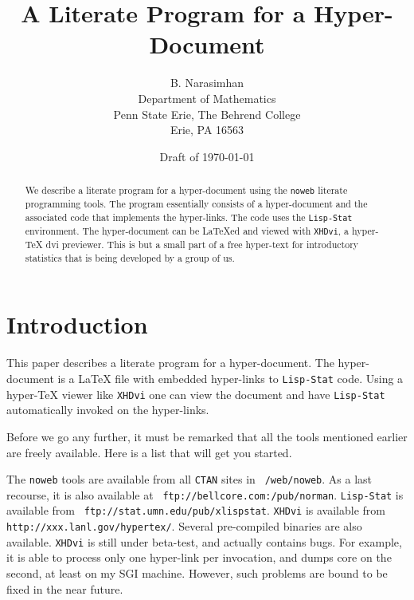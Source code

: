 
\pagestyle{noweb}
\noweboptions{}


\def\nw/{{\tt noweb}}
\def\xhdvi/{{\tt XHDvi}}
\def\xls/{{\tt Lisp-Stat}}
\def\web/{{\tt WEB}}
\def\htex/{hyper-\TeX{}}
\def\[{\ifhmode\ \fi$[\mkern-2mu[$}
\def\]{$]\mkern-2mu]$}
\def\xls/{{\tt Lisp-Stat}}
\def\lisp/{{\tt Lisp}}
\def\mosaic/{{\tt Mosaic}}


\title{A Literate Program for a Hyper-Document}
\author{B. Narasimhan\\
  Department of Mathematics\\   
  Penn State Erie, The Behrend College\\
  Erie, PA 16563}

\date{Draft of \today}

\maketitle

\begin{abstract} 

  We describe a literate program for a hyper-document using the \nw/
  literate programming tools. The program essentially consists of a
  hyper-document and the associated code that implements the
  hyper-links. The code uses the \xls/ environment. The hyper-document
  can be \LaTeX{}ed and viewed with \xhdvi/, a \htex/ dvi previewer.
  This is but a small part of a free hyper-text for introductory
  statistics that is being developed by a group of us.

\end{abstract} 

\section{Introduction} 
\label{sec:intro}
This paper describes a literate program for a hyper-document. The
hyper-document is a \LaTeX{} file with embedded hyper-links to \xls/
code. Using a \htex/ viewer like \xhdvi/ one can view the document and
have \xls/ automatically invoked on the hyper-links.  

Before we go any further, it must be remarked that all the tools
mentioned earlier are freely available. Here is a list that will get
you started.

The \nw/ tools are available from all {\tt CTAN} sites in {\tt
  /web/noweb}. As a last recourse, it is also available at {\tt
  ftp://bellcore.com:/pub/norman}. \xls/ is available from {\tt
  ftp://stat.umn.edu/pub/xlispstat}.  \xhdvi/ is available from {\tt
  http://xxx.lanl.gov/hypertex/}.  Several pre-compiled binaries are
also available.  \xhdvi/ is still under beta-test, and actually
contains bugs.  For example, it is able to process only one hyper-link
per invocation, and dumps core on the second, at least on my SGI
machine. However, such problems are bound to be fixed in the near
future.

